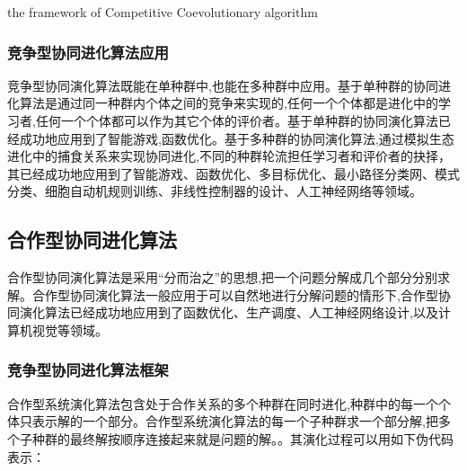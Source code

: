 \documentclass[a4paper]{article}
\begin{document}
    \begin{algorithm}[H]
        
        \caption{the framework of Competitive Coevolutionary algorithm}
        \label{alg1}
        \onehalfspacing

        \begin{algorithmic}[1]
            \EndWhile
        \end{algorithmic}

    \end{algorithm}

    \subsubsection{竞争型协同进化算法应用}

    竞争型协同演化算法既能在单种群中,也能在多种群中应用。基于单种群的协同进化算法是通过同一种群内个体之间的竞争来实现的,任何一个个体都是进化中的学习者,任何一个个体都可以作为其它个体的评价者。基于单种群的协同演化算法已经成功地应用到了智能游戏,函数优化。基于多种群的协同演化算法,通过模拟生态进化中的捕食关系来实现协同进化,不同的种群轮流担任学习者和评价者的抉择，其已经成功地应用到了智能游戏、函数优化、多目标优化、最小路径分类网、模式分类、细胞自动机规则训练、非线性控制器的设计、人工神经网络等领域。

    \subsection{合作型协同进化算法}

    合作型协同演化算法是采用“分而治之”的思想,把一个问题分解成几个部分分别求解。合作型协同演化算法一般应用于可以自然地进行分解问题的情形下,合作型协同演化算法已经成功地应用到了函数优化、生产调度、人工神经网络设计,以及计算机视觉等领域。

    \subsubsection{竞争型协同进化算法框架}
    合作型系统演化算法包含处于合作关系的多个种群在同时进化,种群中的每一个个体只表示解的一个部分。合作型系统演化算法的每一个子种群求一个部分解,把多个子种群的最终解按顺序连接起来就是问题的解。。其演化过程可以用如下伪代码表示：
\end{document}
